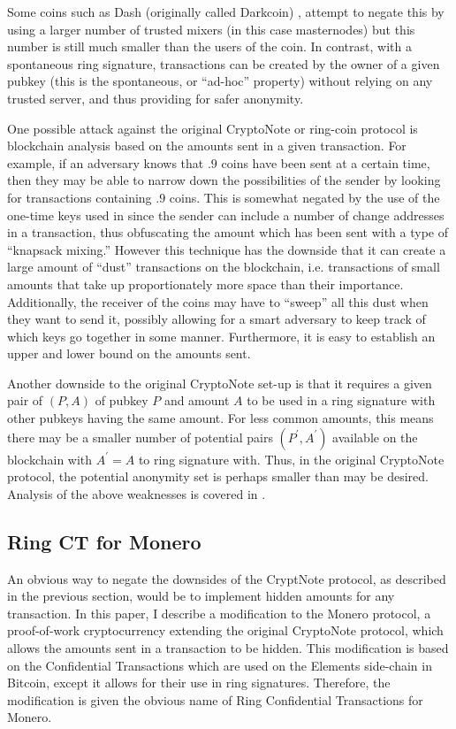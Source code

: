 \documentclass[12pt,english]{mrl}
\theoremstyle{definition}
\numberwithin{equation}{section}
\numberwithin{figure}{section}
\numberwithin{equation}{section}
\numberwithin{equation}{section}
\numberwithin{figure}{section}
\begin{document}
Some coins such
as Dash (originally called Darkcoin) \cite{DASH}, attempt to negate this by using a larger number
of trusted mixers (in this case masternodes) but this number is still
much smaller than the users of the coin. In contrast, with a spontaneous
ring signature, transactions can be created by the owner of a given
pubkey (this is the spontaneous, or ``ad-hoc'' property) without relying
on any trusted server, and thus providing for safer anonymity. 

One possible attack against the original CryptoNote or  ring-coin protocol \cite{CN,B2}
is blockchain analysis based on the amounts sent in a given transaction.
For example, if an adversary knows that $.9$ coins have been sent
at a certain time, then they may be able to narrow down the possibilities
of the sender by looking for transactions containing $.9$ coins.
This is somewhat negated by the use of the one-time keys used in \cite{CN}
since the sender can include a number of change addresses in a transaction,
thus obfuscating the amount which has been sent with a type of ``knapsack mixing.'' However this technique
has the downside that it can create a large amount of ``dust'' transactions
on the blockchain, i.e. transactions of small amounts that take up
proportionately more space than their importance. Additionally, the
receiver of the coins may have to ``sweep'' all this dust when they
want to send it, possibly allowing for a smart adversary to keep track
of which keys go together in some manner. Furthermore, it is easy to establish an upper and lower bound on the amounts sent. 

Another downside to the original CryptoNote set-up is that it requires a given
pair of $\left(P,A\right)$ of pubkey $P$ and amount $A$ to be used in a ring
signature with other pubkeys having the same amount. For less common
amounts, this means there may be a smaller number of potential pairs
$\left(P^{\prime},A^{\prime}\right)$ available on the blockchain
with $A^{\prime}=A$ to ring signature with. Thus, in the original CryptoNote protocol, the potential anonymity set is perhaps smaller than may be desired. 
  Analysis of the above weaknesses is covered in \cite{mrl4}.


\subsection{Ring CT for Monero}

An obvious way to negate the downsides of the CryptNote protocol, as described in the previous section, would be to implement hidden amounts for any transaction.
In this
paper, I describe a modification to the Monero protocol, a proof-of-work
cryptocurrency extending the original CryptoNote protocol, which allows the amounts sent in
a transaction to be hidden. This modification is based on the Confidential
Transactions \cite{GM} which are used on the Elements side-chain
in Bitcoin, except it allows for their use in ring signatures. Therefore,
the modification is given the obvious name of Ring Confidential Transactions for Monero. 
\end{document}
